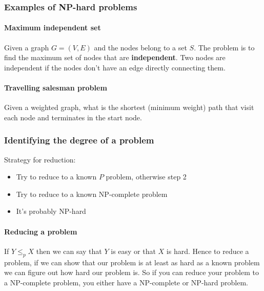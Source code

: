 \documentclass[12pt]{article} %
\begin{document}
\subsubsection{Examples of NP-hard problems}

\paragraph{Maximum independent set}
Given a graph $G = (V, E)$ and the nodes belong to a set $S$. The problem is to find the maximum set of nodes that are \textbf{independent}. Two nodes are independent if the nodes don't have an edge directly connecting them.

\paragraph{Travelling salesman problem}
Given a weighted graph, what is the shortest (minimum weight) path that visit each node and terminates in the start node.

\subsubsection{Identifying the degree of a problem}
Strategy for reduction:
\begin{itemize}
    \item Try to reduce to a known $P$ problem, otherwise step 2
    \item Try to reduce to a known NP-complete problem
    \item It's probably NP-hard
\end{itemize}

\paragraph{Reducing a problem}
If $Y \leq_{p} X$  then we can say that $Y$ is easy or that $X$ is hard. Hence to reduce a problem, if we can show that our problem is at least as hard as a known problem we can figure out how hard our problem is. So if you can reduce your problem to a NP-complete problem, you either have a NP-complete or NP-hard problem.
\end{document}
